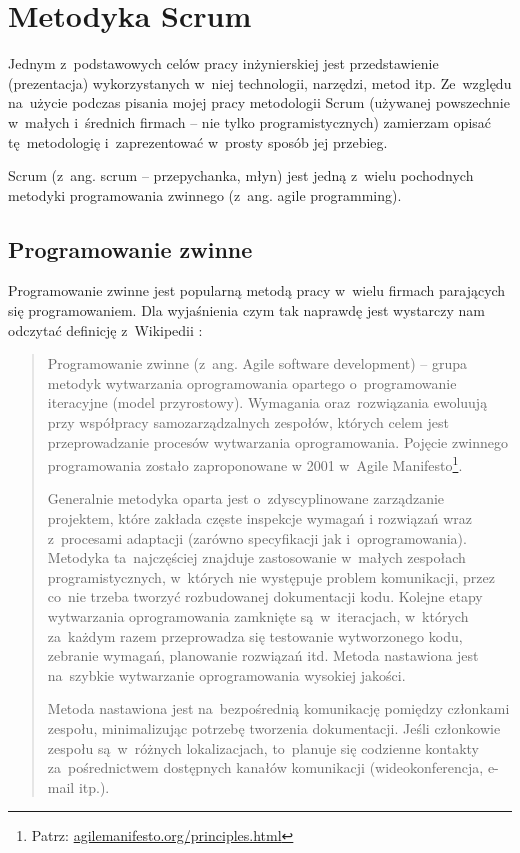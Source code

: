 \section{Metodyka Scrum} \label{scrum}

Jednym z~podstawowych celów pracy inżynierskiej jest przedstawienie (prezentacja) wykorzystanych w~niej technologii, narzędzi, metod itp. Ze~względu na~użycie podczas pisania mojej pracy metodologii Scrum (używanej powszechnie w~małych i~średnich firmach -- nie tylko programistycznych) zamierzam opisać tę~metodologię i~zaprezentować w~prosty sposób jej przebieg.


Scrum \cite{scrumalliance} (z~ang. scrum -- przepychanka, młyn) jest jedną z~wielu pochodnych metodyki programowania zwinnego \cite{agile1} (z~ang. agile programming).

\subsection{Programowanie zwinne} \label{scrum.agile}

Programowanie zwinne jest popularną metodą pracy w~wielu firmach parających się programowaniem. Dla wyjaśnienia czym tak naprawdę jest wystarczy nam odczytać definicję z~Wikipedii \cite{agile2}:

\begin{quote}
Programowanie zwinne (z~ang. Agile software development) -- grupa metodyk wytwarzania oprogramowania opartego o~programowanie iteracyjne (model przyrostowy). Wymagania oraz~rozwiązania ewolu\-ują przy współpracy samozarządzalnych zespołów, których celem jest przeprowadzanie procesów wytwarzania oprogramowania. Pojęcie zwinnego programowania zostało zaproponowane w 2001 w~Agile Manifesto\footnote{Patrz: \url{agilemanifesto.org/principles.html}}.


Generalnie metodyka oparta jest o~zdyscyplinowane zarządzanie projektem, które zakłada częste inspekcje wymagań i rozwiązań wraz z~procesami adaptacji (zarówno specyfikacji jak i~oprogramowania). Metodyka ta~najczęściej znajduje zastosowanie w~małych zespołach programistycznych, w~których nie występuje problem komunikacji, przez co~nie trzeba tworzyć rozbudowanej dokumentacji kodu. Kolejne etapy wytwarzania oprogramowania zamknięte są~w~iteracjach, w~których za~każdym razem przeprowadza się testowanie wytworzonego kodu, zebranie wymagań, planowanie rozwiązań itd. Metoda nastawiona jest na~szybkie wytwarzanie oprogramowania wysokiej jakości.


Metoda nastawiona jest na~bezpośrednią komunikację pomiędzy członkami zespołu, minimalizując potrzebę tworzenia dokumentacji. Jeśli członkowie zespołu są~w~różnych lokalizacjach, to~planuje się codzienne kontakty za~pośrednictwem dostępnych kanałów komunikacji (wideokonferencja, e-mail itp.).
\end{quote}

